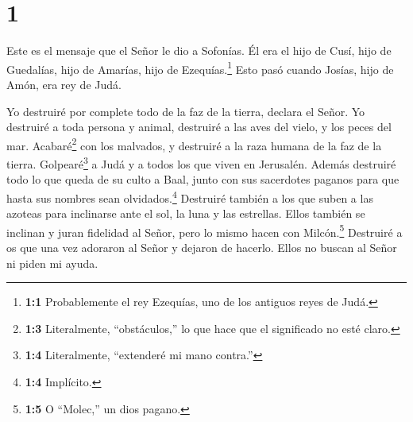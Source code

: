 \hypertarget{section}{%
\section{1}\label{section}}

 Este es el mensaje que el Señor le dio a Sofonías. Él era
el hijo de Cusí, hijo de Guedalías, hijo de Amarías, hijo de
Ezequías.\footnote{\textbf{1:1} Probablemente el rey Ezequías, uno de
  los antiguos reyes de Judá.} Esto pasó cuando Josías, hijo de Amón,
era rey de Judá.

 Yo destruiré por complete todo de la faz de la tierra,
declara el Señor.  Yo destruiré a toda persona y animal,
destruiré a las aves del vielo, y los peces del mar. Acabaré\footnote{\textbf{1:3}
  Literalmente, ``obstáculos,'' lo que hace que el significado no esté
  claro.} con los malvados, y destruiré a la raza humana de la faz de la
tierra.  Golpearé\footnote{\textbf{1:4} Literalmente,
  ``extenderé mi mano contra.''} a Judá y a todos los que viven en
Jerusalén. Además destruiré todo lo que queda de su culto a Baal, junto
con sus sacerdotes paganos para que hasta sus nombres sean
olvidados.\footnote{\textbf{1:4} Implícito.}  Destruiré
también a los que suben a las azoteas para inclinarse ante el sol, la
luna y las estrellas. Ellos también se inclinan y juran fidelidad al
Señor, pero lo mismo hacen con Milcón.\footnote{\textbf{1:5} O
  ``Molec,'' un dios pagano.}  Destruiré a os que una vez
adoraron al Señor y dejaron de hacerlo. Ellos no buscan al Señor ni
piden mi ayuda.

